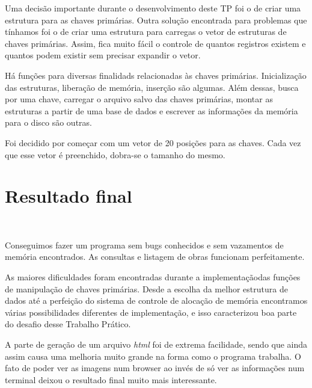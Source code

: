 \documentclass{article}
\begin{document}
Uma decisão importante durante o desenvolvimento deste TP foi o de criar uma estrutura para as chaves primárias. Outra solução encontrada para problemas que tínhamos foi o de criar uma estrutura para carregas o vetor de estruturas de chaves primárias. Assim, fica muito fácil o controle de quantos registros existem e quantos podem existir sem precisar expandir o vetor.

Há funções para diversas finalidads relacionadas às chaves primárias. Inicialização das estruturas, liberação de memória, inserção são algumas. Além dessas, busca por uma chave, carregar o arquivo salvo das chaves primárias, montar as estruturas a partir de uma base de dados e escrever as informações da memória para o disco são outras.

Foi decidido por começar com um vetor de 20 posições para as chaves. Cada vez que esse vetor é preenchido, dobra-se o tamanho do mesmo.

\section{Resultado final}\

Conseguimos fazer um programa sem bugs conhecidos e sem vazamentos de memória encontrados. As consultas e listagem de obras funcionam perfeitamente.

As maiores dificuldades foram encontradas durante a implementaçãodas funções de manipulação de chaves primárias. Desde a escolha da melhor estrutura de dados até a perfeição do sistema de controle de alocação de memória encontramos várias possibilidades diferentes de implementação, e isso caracterizou boa parte do desafio desse Trabalho Prático.

A parte de geração de um arquivo \textit{html} foi de extrema facilidade, sendo que ainda assim causa uma melhoria muito grande na forma como o programa trabalha. O fato de poder ver as imagens num browser ao invés de só ver as informações num terminal deixou o resultado final muito mais interessante.
\end{document}
